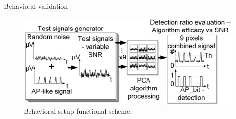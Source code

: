 \documentclass{beamer}
\begin{document}
\begin{frame}{Behavioral validation}
\begin{figure}
             \includegraphics[width=\textwidth]{images_Alice/behavioral_setup.png}
                \caption{Behavioral setup functional scheme.}
                \label{fig:behavioral_setup}
            \end{figure}
\end{frame}
\end{document}
